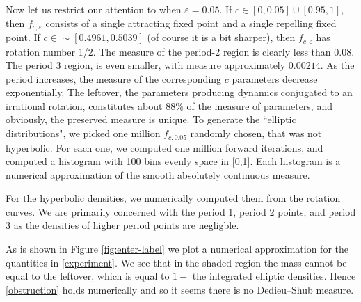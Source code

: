 \documentclass[10pt]{amsart}
\numberwithin{equation}{section}     %
\begin{document}
Now let us restrict our attention to when $\varepsilon = 0.05$. If $c \in [0,0.05] \cup [0.95,1]$, then $f_{c,\varepsilon}$ consists of a single attracting fixed point and a single repelling fixed point. If $c \in \sim [0.4961, 0.5039]$ (of course it is a bit sharper), then $f_{c,\varepsilon}$ has rotation number 1/2. The measure of the period-2 region is clearly less than 0.08. The period 3 region, is even smaller, with measure approximately $0.00214$. As the period increases, the measure of the corresponding $c$ parameters decrease exponentially. The leftover, the parameters producing dynamics conjugated to an irrational rotation, constitutes about $88\%$ of the measure of parameters, and obviously, the preserved measure is unique. To generate the ``elliptic distributions", we picked one million $f_{c,0.05}$ randomly chosen, that was not hyperbolic. For each one, we computed one million forward iterations, and computed a histogram with 100 bins evenly space in [0,1]. Each histogram is a numerical approximation of the smooth absolutely continuous measure.  




For the hyperbolic densities, we numerically computed them from the rotation curves. We are primarily concerned with the period 1, period 2 points, and period 3 as the densities of higher period points are negligble. 

As is shown in Figure \ref{fig:enter-label} we plot a numerical approximation for the quantities in \ref{experiment}. We see that in the shaded region the mass cannot be equal to the leftover, which is equal to $1 - $ the integrated elliptic densities. Hence \ref{obstruction} holds numerically and so it seems there is no Dedieu--Shub measure. 
\end{document}
